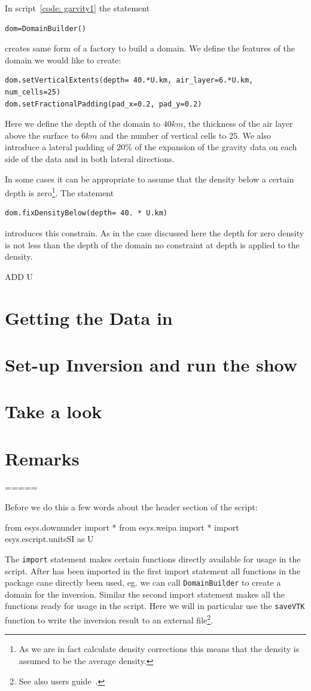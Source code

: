 In script~\ref{code: garvity1} the statement
\begin{verbatim}
dom=DomainBuilder()
\end{verbatim}
creates same form of a factory to build a domain. 
We define the features of the domain we would like to create:
\begin{verbatim}
dom.setVerticalExtents(depth= 40.*U.km, air_layer=6.*U.km, num_cells=25)
dom.setFractionalPadding(pad_x=0.2, pad_y=0.2)
\end{verbatim}
Here we define the depth of the domain to $40 km$, the thickness of the air layer above the surface to $6km$ and 
the number of vertical cells to $25$. We also introduce a lateral padding of $20 \%$ of the expansion of
the gravity data on each side of the data and in both lateral directions.

In some cases it can be appropriate to assume that the density below a certain depth is 
zero\footnote{As we are in fact calculate density corrections this means that the density is assumed to be
the average density.}. The statement 
\begin{verbatim}
dom.fixDensityBelow(depth= 40. * U.km)
\end{verbatim}
introduces this constrain. As in the case discussed here the depth for zero density is not less than the
depth of the domain no constraint at depth is applied to the density.

ADD U 

\section{Getting the Data in}

\section{Set-up Inversion and run the show}

\section{Take a look}

\section{Remarks}

=====


Before we do this a few words about the header section of the script:
\begin{verbatim*}
from esys.downunder import *
from esys.weipa import *
import esys.escript.unitsSI as U
\end{verbatim*}
The \verb|import| statement makes certain functions directly available for usage in the script. After \downunder
has been imported in the first import statement all functions in the \downunder package cane directly been used,
eg. we can call \verb|DomainBuilder| to create a domain for the inversion. Similar 
the second import statement makes all the \weipa functions ready for usage in the script. 
Here we will in particular use the \verb|saveVTK| function to write the inversion result to 
an external file\footnote{See also \escript users guide~\cite{ESCRIPT}.}.


